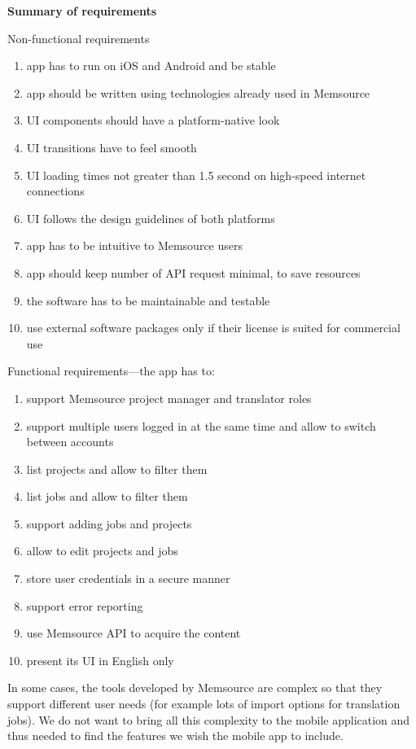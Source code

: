 {\bf Summary of requirements}

Non-functional requirements
\begin{enumerate}
	\item app has to run on iOS and Android and be stable
	\item app should be written using technologies already used in Memsource
	\item UI components should have a platform-native look
	\item UI transitions have to feel smooth
	\item UI loading times not greater than 1.5 second on high-speed internet connections
	\item UI follows the design guidelines of both platforms
	\item app has to be intuitive to Memsource users
	\item app should keep number of API request minimal, to save resources
	\item the software has to be maintainable and testable
	\item use external software packages only if their license is suited for commercial use
\end{enumerate}

Functional requirements---the app has to:
\begin{enumerate}
	\item support Memsource project manager and translator roles
	\item support multiple users logged in at the same time and allow to switch between accounts
	\item list projects and allow to filter them
	\item list jobs and allow to filter them
	\item support adding jobs and projects
	\item allow to edit projects and jobs
	\item store user credentials in a secure manner
	\item support error reporting 
	\item use Memsource API to acquire the content
	\item present its UI in English only
\end{enumerate}

In some cases, the tools developed by Memsource are complex so that they support different user needs (for example lots of import options for translation jobs). We do not want to bring all this complexity to the mobile application and thus needed to find the features we wish the mobile app to include. 

